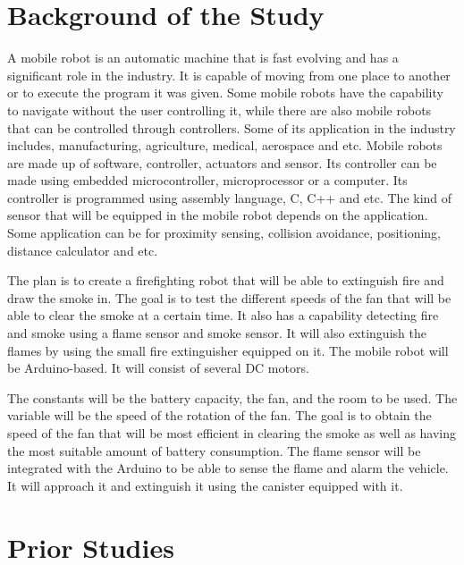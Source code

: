 \section{Background of the Study}
	A mobile robot is an automatic machine that is fast evolving and has a significant role in the industry. It is capable of moving from one place to another or to execute the program it was given. Some mobile robots have the capability to navigate without the user controlling it, while there are also mobile robots that can be controlled through controllers. Some of its application in the industry includes, manufacturing, agriculture, medical, aerospace and etc. Mobile robots are made up of software, controller, actuators and sensor. Its controller can be made using embedded microcontroller, microprocessor or a computer. Its controller is programmed using assembly language, C, C++ and etc. The kind of sensor that will be equipped in the mobile robot depends on the application. Some application can be for proximity sensing, collision avoidance, positioning, distance calculator and etc. 

	The plan is to create a firefighting robot that will be able to extinguish fire and draw the smoke in. The goal is to test the different speeds of the fan that will be able to clear the smoke at a certain time. It also has a capability detecting fire and smoke using a flame sensor and smoke sensor. It will also extinguish the flames by using the small fire extinguisher equipped on it. The mobile robot will be Arduino-based. It will consist of several DC motors.

	The constants will be the battery capacity, the fan, and the room to be used. The variable will be the speed of the rotation of the fan. The goal is to obtain the speed of the fan that will be most efficient in clearing the smoke as well as having the most suitable amount of battery consumption. The flame sensor will be integrated with the Arduino to be able to sense the flame and alarm the vehicle. It will approach it and extinguish it using the canister equipped with it.


\section{Prior Studies}


